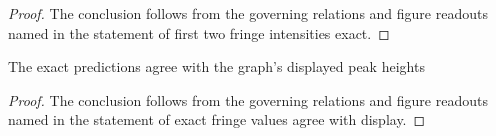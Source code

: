 \begin{proof}
  The conclusion follows from the governing relations and figure readouts named in the statement of first two fringe intensities exact.
\end{proof}
\begin{lemma}
  \label{lem:physics:phyx-mini-0082:phyxminiproblems-problemphyxmini0082-exact-fringe-values-agree-with-display}
  The exact predictions agree with the graph's displayed peak heights
\end{lemma}
\begin{proof}
  The conclusion follows from the governing relations and figure readouts named in the statement of exact fringe values agree with display.
\end{proof}
